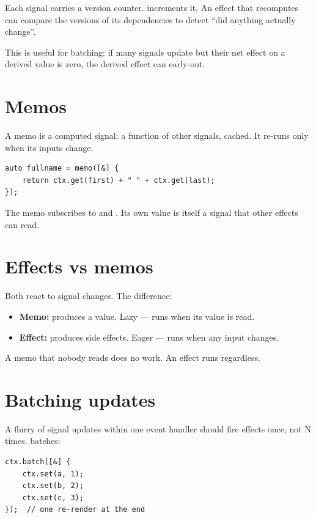Each signal carries a version counter.  increments
it. An effect that recomputes can compare the versions of
its dependencies to detect ``did anything actually change''.

This is useful for batching: if many signals update but
their net effect on a derived value is zero, the derived
effect can early-out.

\section{Memos}

A memo is a computed signal: a function of other signals,
cached. It re-runs only when its inputs change.

\begin{lstlisting}
auto fullname = memo([&] {
    return ctx.get(first) + " " + ctx.get(last);
});
\end{lstlisting}

The memo subscribes to  and . Its
own value is itself a signal that other effects can read.

\section{Effects vs memos}

Both react to signal changes. The difference:

\begin{itemize}[leftmargin=*]
  \item \textbf{Memo:} produces a value. Lazy --- runs when
    its value is read.
  \item \textbf{Effect:} produces side effects. Eager --- runs
    when any input changes.
\end{itemize}

A memo that nobody reads does no work. An effect runs
regardless.

\section{Batching updates}

A flurry of signal updates within one event handler should
fire effects once, not N times. \maya{} batches:

\begin{lstlisting}
ctx.batch([&] {
    ctx.set(a, 1);
    ctx.set(b, 2);
    ctx.set(c, 3);
});  // one re-render at the end
\end{lstlisting}

